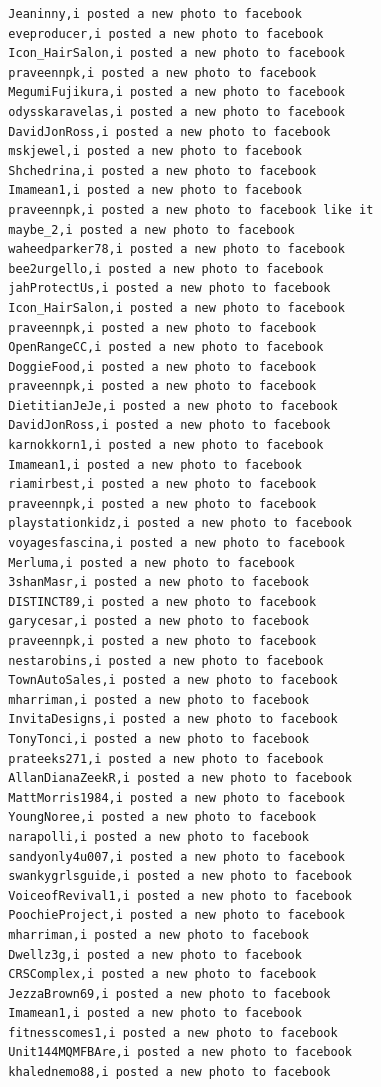 \begin{figure}[htpb]
\begin{verbatim}
  Jeaninny,i posted a new photo to facebook
  eveproducer,i posted a new photo to facebook
  Icon_HairSalon,i posted a new photo to facebook
  praveennpk,i posted a new photo to facebook
  MegumiFujikura,i posted a new photo to facebook
  odysskaravelas,i posted a new photo to facebook
  DavidJonRoss,i posted a new photo to facebook
  mskjewel,i posted a new photo to facebook
  Shchedrina,i posted a new photo to facebook
  Imamean1,i posted a new photo to facebook
  praveennpk,i posted a new photo to facebook like it
  maybe_2,i posted a new photo to facebook
  waheedparker78,i posted a new photo to facebook
  bee2urgello,i posted a new photo to facebook
  jahProtectUs,i posted a new photo to facebook
  Icon_HairSalon,i posted a new photo to facebook
  praveennpk,i posted a new photo to facebook
  OpenRangeCC,i posted a new photo to facebook
  DoggieFood,i posted a new photo to facebook
  praveennpk,i posted a new photo to facebook
  DietitianJeJe,i posted a new photo to facebook
  DavidJonRoss,i posted a new photo to facebook
  karnokkorn1,i posted a new photo to facebook
  Imamean1,i posted a new photo to facebook
  riamirbest,i posted a new photo to facebook
  praveennpk,i posted a new photo to facebook
  playstationkidz,i posted a new photo to facebook
  voyagesfascina,i posted a new photo to facebook
  Merluma,i posted a new photo to facebook
  3shanMasr,i posted a new photo to facebook
  DISTINCT89,i posted a new photo to facebook
  garycesar,i posted a new photo to facebook
  praveennpk,i posted a new photo to facebook
  nestarobins,i posted a new photo to facebook
  TownAutoSales,i posted a new photo to facebook
  mharriman,i posted a new photo to facebook
  InvitaDesigns,i posted a new photo to facebook
  TonyTonci,i posted a new photo to facebook
  prateeks271,i posted a new photo to facebook
  AllanDianaZeekR,i posted a new photo to facebook
  MattMorris1984,i posted a new photo to facebook
  YoungNoree,i posted a new photo to facebook
  narapolli,i posted a new photo to facebook
  sandyonly4u007,i posted a new photo to facebook
  swankygrlsguide,i posted a new photo to facebook
  VoiceofRevival1,i posted a new photo to facebook
  PoochieProject,i posted a new photo to facebook
  mharriman,i posted a new photo to facebook
  Dwellz3g,i posted a new photo to facebook
  CRSComplex,i posted a new photo to facebook
  JezzaBrown69,i posted a new photo to facebook
  Imamean1,i posted a new photo to facebook
  fitnesscomes1,i posted a new photo to facebook
  Unit144MQMFBAre,i posted a new photo to facebook
  khalednemo88,i posted a new photo to facebook

\end{verbatim}
\end{figure}
